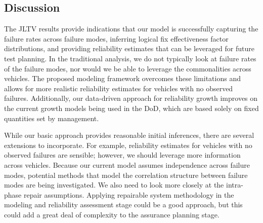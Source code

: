 \documentclass[12pt]{article}
\begin{document}
\subsection{Discussion}
The JLTV results provide indications that our model is successfully
capturing the failure rates across failure modes, inferring logical fix
effectiveness factor distributions, and providing reliability estimates that can
be leveraged for future test planning. In the traditional analysis, we do not
typically look at failure rates of the failure modes, nor would we be able to
leverage the commonalities across vehicles. The proposed modeling framework
overcomes these limitations and allows for more realistic reliability estimates
for vehicles with no observed failures. Additionally, our data-driven approach
for reliability growth improves on the current growth models being used in the
DoD, which are based solely on fixed quantities set by management.

While our basic approach provides reasonable initial inferences, there are
several extensions to incorporate. For example, reliability estimates for
vehicles with no observed failures are sensible; however, we should leverage
more information across vehicles. Because our
current model assumes independence across failure modes, potential methods that model the correlation structure
between failure modes are being investigated. We
also need to look more closely at the intra-phase repair assumptions.  Applying
repairable system methodology in the modeling and reliability assessment stage
could be a good approach, but this could  add a great deal of complexity to the
assurance planning stage.
\end{document}
